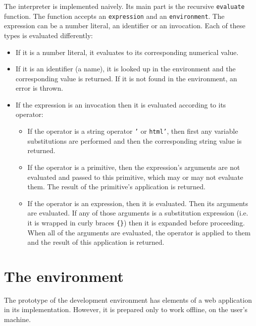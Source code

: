 The interpreter is implemented naively. Its main part is the recursive \texttt{evaluate} function. The function accepts an \texttt{expression} and an \texttt{environment}. The expression can be a number literal, an identifier or an invocation. Each of these types is evaluated differently:
\begin{itemize}
\item If it is a number literal, it evaluates to its corresponding numerical value.

\item If it is an identifier (a name), it is looked up in the environment and the corresponding value is returned. If it is not found in the environment, an error is thrown.

\item If the expression is an invocation then it is evaluated according to its operator:
\begin{itemize}
\item If the operator is a string operator \texttt{'} or \texttt{html'}, then first any variable substitutions are performed and then the corresponding string value is returned.
\item If the operator is a primitive, then the expression's arguments are not evaluated and passed to this primitive, which may or may not evaluate them. The result of the primitive's application is returned.
\item If the operator is an expression, then it is evaluated. Then its arguments are evaluated. If any of those arguments is a substitution expression (i.e. it is wrapped in curly braces \texttt{\{\}}) then it is expanded before proceeding. When all of the arguments are evaluated, the operator is applied to them and the result of this application is returned.
\end{itemize}
\end{itemize}   


\section{The environment}
The prototype of the development environment has elements of a web application in its implementation. However, it is prepared only to work offline, on the user's machine.

